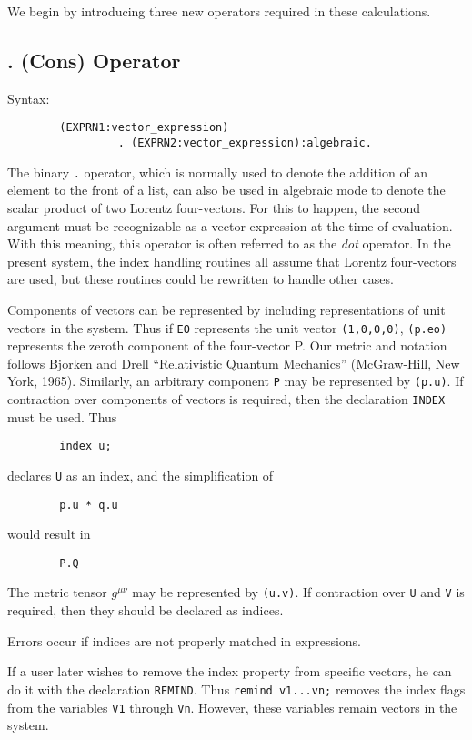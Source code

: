 \documentclass[11pt,letterpaper]{book}
\makeatletter
\newcommand{\underscore}{\_}
\newcommand{\ttindex}[1]{{\renewcommand{\_}{\protect\underscore}%
                          \index{#1@{\tt #1}}}}
\makeatother
\begin{document}
We begin by introducing three new operators required in these calculations.

\subsection{. (Cons) Operator}
Syntax:
{\small\begin{verbatim}
        (EXPRN1:vector_expression)
                 . (EXPRN2:vector_expression):algebraic.
\end{verbatim}}
The binary {\tt .} operator, which is normally used to denote the addition
of an element to the front of a list, can also be used in algebraic mode
to denote the scalar product of two Lorentz four-vectors.  For this to
happen, the second argument must be recognizable as a vector expression
 at the time of
evaluation.  With this meaning, this operator is often referred to as the
{\em dot\/} operator.  In the present system, the index handling routines all
assume that Lorentz four-vectors are used, but these routines could be
rewritten to handle other cases.

Components of vectors can be represented by including representations of
unit vectors in the system.  Thus if {\tt EO} represents the unit vector
{\tt (1,0,0,0)}, {\tt (p.eo)} represents the zeroth component of the
four-vector P.  Our metric and notation follows Bjorken and Drell
``Relativistic Quantum Mechanics'' (McGraw-Hill, New York, 1965).
Similarly, an arbitrary component {\tt P} may be represented by
{\tt (p.u)}.  If contraction over components of vectors is required, then
the declaration {\tt INDEX}\ttindex{INDEX} must be used.  Thus
{\small\begin{verbatim}
        index u;
\end{verbatim}}
declares {\tt U} as an index, and the simplification of
{\small\begin{verbatim}
        p.u * q.u
\end{verbatim}}
would result in
{\small\begin{verbatim}
        P.Q
\end{verbatim}}
The metric tensor $g^{\mu \nu}$ may be represented by {\tt (u.v)}.  If
contraction over {\tt U} and {\tt V} is required, then they should be
declared as indices.

Errors occur if indices are not properly matched in expressions.

If a user later wishes to remove the index property from specific vectors,
he can do it with the declaration {\tt REMIND}.\ttindex{REMIND} Thus
{\tt remind v1...vn;} removes the index flags from the variables {\tt V1}
through {\tt Vn}.  However, these variables remain vectors in the system.
\end{document}

